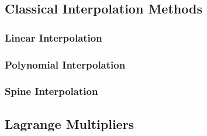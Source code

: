 \subsection{Classical Interpolation Methods}
\label{sec:app:interp}
\subsubsection{Linear Interpolation}
\subsubsection{Polynomial Interpolation}
\subsubsection{Spine Interpolation}

\subsection{Lagrange Multipliers}
